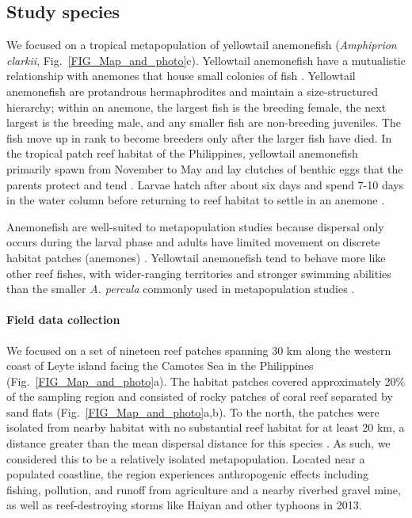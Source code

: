 \documentclass[12pt, oneside]{article}   	%
\begin{document}
\subsection*{Study species}

We focused on a tropical metapopulation of yellowtail anemonefish (\textit{Amphiprion clarkii}, Fig.\ \ref{FIG_Map_and_photo}c). Yellowtail anemonefish have a mutualistic relationship with anemones that house small colonies of fish \citep{buston2003social, fautin1992field}. Yellowtail anemonefish are protandrous hermaphrodites and maintain a size-structured hierarchy; within an anemone, the largest fish is the breeding female, the next largest is the breeding male, and any smaller fish are non-breeding juveniles. The fish move up in rank to become breeders only after the larger fish have died. In the tropical patch reef habitat of the Philippines, yellowtail anemonefish primarily spawn from November to May and lay clutches of benthic eggs that the parents protect and tend \citep{ochi1989mating, holtswarth2017fecundity}. Larvae hatch after about six days and spend 7-10 days in the water column before returning to reef habitat to settle in an anemone \citep{fautin1992field}.

Anemonefish are well-suited to metapopulation studies because dispersal only occurs during the larval phase and adults have limited movement on discrete habitat patches (anemones) \citep[e.g.,][]{buston2013marine, salles_coral_2015, almany2017larval}. Yellowtail anemonefish tend to behave more like other reef fishes, with wider-ranging territories and stronger swimming abilities \citep{hattori1991life, ochi1989mating} than the smaller \textit{A. percula} commonly used in metapopulation studies \citep[e.g.,][]{buston2011probability, salles_coral_2015}. %

\paragraph*{Field data collection}

We focused on a set of nineteen reef patches spanning 30 km along the western coast of Leyte island facing the Camotes Sea in the Philippines (Fig.\ \ref{FIG_Map_and_photo}a). The habitat patches covered approximately 20\% of the sampling region and consisted of rocky patches of coral reef separated by sand flats (Fig.\ \ref{FIG_Map_and_photo}a,b). To the north, the patches were isolated from nearby habitat with no substantial reef habitat for at least 20 km, a distance greater than the mean dispersal distance for this species \citep{pinsky2010using}. As such, we considered this to be a relatively isolated metapopulation. Located near a populated coastline, the region experiences anthropogenic effects including fishing, pollution, and runoff from agriculture and a nearby riverbed gravel mine, as well as reef-destroying storms like Haiyan and other typhoons in 2013.%
\end{document}
